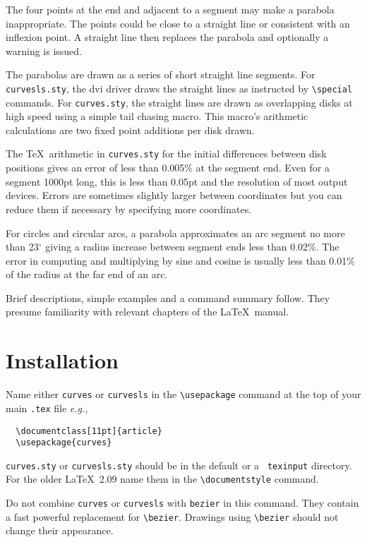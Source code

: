   The four points at the end and adjacent to a segment may make a parabola 
inappropriate. The points could be close to a straight line or consistent with 
an inflexion point.  A straight line then replaces the parabola and optionally 
a warning is issued. 

The parabolas are drawn as a series of short straight line segments.
For {\tt curvesls.sty}, the dvi driver draws the straight lines as instructed 
by \verb?\special? commands. For {\tt curves.sty}, the straight lines are 
drawn as overlapping disks at high speed using a simple tail chasing macro. 
This macro's arithmetic calculations are two fixed point additions per disk 
drawn. 

The \TeX\ arithmetic in {\tt curves.sty} for the initial differences
between disk positions gives an error of less than 0.005\% at the
segment end. Even for a segment 1000pt long, this is less than 0.05pt and the 
resolution of most output devices. Errors are sometimes slightly larger 
between coordinates but you can reduce them if necessary by specifying more 
coordinates. 

  For circles and circular arcs, a parabola approximates an arc segment no
more than 23$^\circ$ giving a radius increase between segment ends less than
0.02\%. The error in computing and multiplying by sine and cosine is usually
less than 0.01\% of the radius at the far end of an arc.

  Brief descriptions, simple examples and a command summary follow. They
presume familiarity with relevant chapters of the \LaTeX\
manual\footnotemark[1].

  \section{Installation}

  Name either {\tt curves} or {\tt curvesls} in the \verb?\usepackage?
command at the top of your main {\tt .tex} file {\it e.g.\/,}
  \begin{verbatim}
  \documentclass[11pt]{article}
  \usepackage{curves}
  \end{verbatim}
  {\tt curves.sty} or {\tt curvesls.sty} should be in the default or a {\tt
texinput} directory. For the older \LaTeX\ 2.09 name them in the
\verb?\documentstyle? command.

  Do not combine {\tt curves} or {\tt curvesls} with {\tt bezier} in this
command. They contain a fast powerful replacement for \verb?\bezier?.
Drawings using \verb?\bezier? should not change their appearance.

